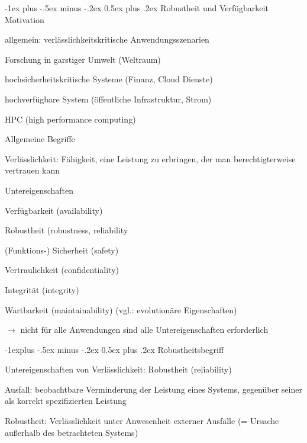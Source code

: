 \documentclass[a4paper]{article}
\makeatletter
\renewcommand{\section}{\@startsection{section}{1}{0mm}%
 {-1ex plus -.5ex minus -.2ex}%
 {0.5ex plus .2ex}%
 {\normalfont\large\bfseries}}
\renewcommand{\subsection}{\@startsection{subsection}{2}{0mm}%
 {-1explus -.5ex minus -.2ex}%
 {0.5ex plus .2ex}%
 {\normalfont\normalsize\bfseries}}
\makeatother
\begin{document}
\begin{multicols}{3}
    \pagebreak
    \pagebreak
    \section{Robustheit und Verfügbarkeit}
    Motivation
    \begin{itemize*}
        \item allgemein: verlässlichkeitskritische Anwendungsszenarien
        \item Forschung in garstiger Umwelt (Weltraum)
        \item hochsicherheitskritische Systeme (Finanz, Cloud Dienste)
        \item hochverfügbare System (öffentliche Infrastruktur, Strom)
        \item HPC (high performance computing)
    \end{itemize*}

    Allgemeine Begriffe
    \begin{itemize*}
        \item Verlässlichkeit: Fähigkeit, eine Leistung zu erbringen, der man berechtigterweise vertrauen kann
        \item Untereigenschaften
        \begin{enumerate*}
            \item Verfügbarkeit (availability)
            \item Robustheit (robustness, reliability
            \item (Funktions-) Sicherheit (safety)
            \item Vertraulichkeit (confidentiality)
            \item Integrität (integrity)
            \item Wartbarkeit (maintainability) (vgl.: evolutionäre Eigenschaften)
        \end{enumerate*}
        \item[$\rightarrow$] nicht für alle Anwendungen sind alle Untereigenschaften erforderlich
    \end{itemize*}

    \subsection{Robustheitsbegriff}
    \begin{itemize*}
        \item Untereigenschaften von Verlässlichkeit: Robustheit (reliability)
        \item Ausfall: beobachtbare Verminderung der Leistung eines Systems, gegenüber seiner als korrekt spezifizierten Leistung
        \item Robustheit: Verlässlichkeit unter Anwesenheit externer Ausfälle (= Ursache außerhalb des betrachteten Systems)
    \end{itemize*}


\end{multicols}
\end{document}
